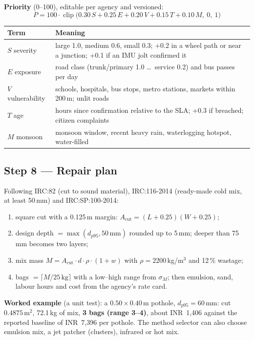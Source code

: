 \documentclass[11pt,a4paper]{article}
\newcommand{\INR}{INR~}
\begin{document}
\textbf{Priority} (0--100), editable per agency and versioned:
\[ P = 100\cdot\operatorname{clip}\big(0.30\,S+0.25\,E+0.20\,V+0.15\,T+0.10\,M,\ 0,\ 1\big) \]
\begin{tabularx}{\textwidth}{@{}l X@{}}
\toprule
\textbf{Term} & \textbf{Meaning}\\
\midrule
$S$ severity & large 1.0, medium 0.6, small 0.3; +0.2 in a wheel path or near a junction; +0.1 if an IMU jolt confirmed it\\
$E$ exposure & road class (trunk/primary 1.0 \ldots\ service 0.2) and bus passes per day\\
$V$ vulnerability & schools, hospitals, bus stops, metro stations, markets within 200\,m; unlit roads\\
$T$ age & hours since confirmation relative to the SLA; +0.3 if breached; citizen complaints\\
$M$ monsoon & monsoon window, recent heavy rain, waterlogging hotspot, water-filled\\
\bottomrule
\end{tabularx}

\subsection{Step 8 --- Repair plan}
Following IRC:82 (cut to sound material), IRC:116-2014 (ready-made cold mix, at least 50\,mm) and IRC:SP:100-2014:
\begin{enumerate}
  \item square cut with a 0.125\,m margin: $A_{\text{cut}}=(L+0.25)(W+0.25)$;
  \item design depth $=\max(d_{p95}, 50\,\text{mm})$ rounded up to 5\,mm; deeper than 75\,mm becomes two layers;
  \item mix mass $M=A_{\text{cut}}\cdot d\cdot\rho\cdot(1+w)$ with $\rho=2200$\,kg/m$^3$ and 12\,\% wastage;
  \item bags $=\lceil M/25\,\text{kg}\rceil$ with a low--high range from $\sigma_M$; then emulsion, sand, labour hours
        and cost from the agency's rate card.
\end{enumerate}
\textbf{Worked example} (a unit test): a $0.50\times0.40$\,m pothole, $d_{p95}=60$\,mm: cut $0.4875$\,m$^2$, 72.1\,kg of
mix, \textbf{3 bags (range 3--4)}, about \INR1,406 against the reported baseline of \INR7,396 per pothole. The method
selector can also choose emulsion mix, a jet patcher (clusters), infrared or hot mix.
\end{document}
